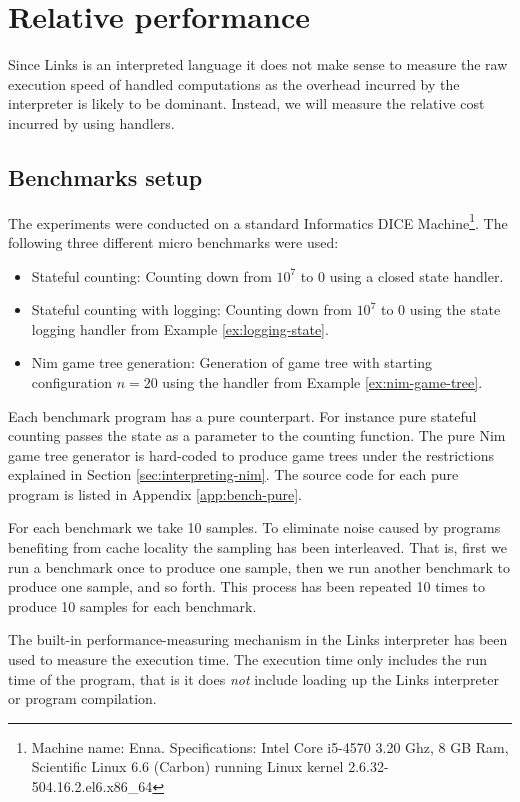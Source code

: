 \section{Relative performance}\label{sec:eval-performance}
Since Links is an interpreted language it does not make sense to measure the raw execution speed of handled computations as the overhead incurred by the interpreter is likely to be dominant. Instead, we will measure the relative cost incurred by using handlers.

\subsection{Benchmarks setup}
The experiments were conducted on a standard Informatics DICE Machine\footnote{Machine name: Enna. Specifications: Intel Core i5-4570 3.20 Ghz, 8 GB Ram, Scientific Linux 6.6 (Carbon) running Linux kernel 2.6.32-504.16.2.el6.x86\_64}. The following three different micro benchmarks were used:
\begin{itemize}
  \item Stateful counting: Counting down from $10^7$ to $0$ using a closed state handler.
  \item Stateful counting with logging: Counting down from $10^7$ to $0$ using the state logging handler from Example \ref{ex:logging-state}.
  \item Nim game tree generation: Generation of game tree with starting configuration $n = 20$ using the handler from Example \ref{ex:nim-game-tree}.
\end{itemize}
Each benchmark program has a pure counterpart. For instance pure stateful counting passes the state as a parameter to the counting function. The pure Nim game tree generator is hard-coded to produce game trees under the restrictions explained in Section \ref{sec:interpreting-nim}. The source code for each pure program is listed in Appendix \ref{app:bench-pure}.

For each benchmark we take 10 samples. To eliminate noise caused by programs benefiting from cache locality the sampling has been interleaved. That is, first we run a benchmark once to produce one sample, then we run another benchmark to produce one sample, and so forth. This process has been repeated 10 times to produce 10 samples for each benchmark.

The built-in performance-measuring mechanism in the Links interpreter has been used to measure the execution time. The execution time only includes the run time of the program, that is it does \emph{not} include loading up the Links interpreter or program compilation.
